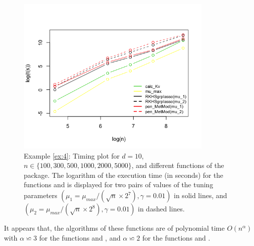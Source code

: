 \begin{figure}[h!]
  \centering
  \includegraphics[width=9.5cm]{Rplot_log.png}
  \caption{Example \ref{ex:4}: Timing plot for $d=10$, $n\in\{100,300,500,1000,2000,5000\}$, and different functions of the  package. The logarithm of the execution time (in seconds) for the functions  and  is displayed for two pairs of values of the tuning parameters $(\mu_1=\mu_{max}/(\sqrt{n}\times 2^7),\gamma=0.01)$ in solid lines, and $(\mu_2=\mu_{max}/(\sqrt{n}\times 2^8),\gamma=0.01)$ in dashed lines.}
  \label{timingplot}
\end{figure}
It appears that, the algorithms of these functions are of polynomial time $O(n^\alpha)$ with $\alpha\backsimeq3$ for the functions  and , and $\alpha\backsimeq2$ for the functions  and .

